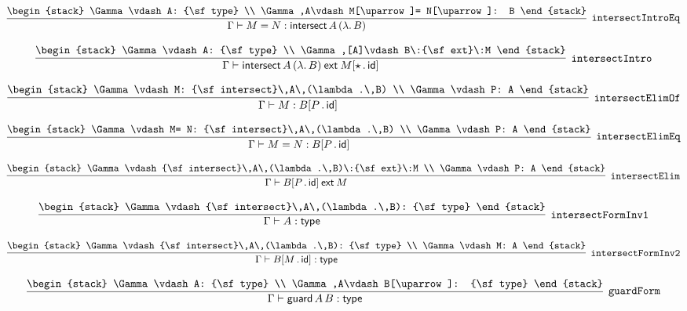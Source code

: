 \[
\infer[{\tt intersectIntroEq}]{\Gamma \vdash M= N: {\sf intersect}\,A\,(\lambda .\,B)}{
\begin{stack}
\Gamma \vdash A: {\sf type}
\\
\Gamma ,A\vdash M[\uparrow ]= N[\uparrow ]: B
\end{stack}}
\]

\[
\infer[{\tt intersectIntro}]{\Gamma \vdash {\sf intersect}\,A\,(\lambda .\,B)\:{\sf ext}\:M[\star \,.\,{\sf id}]}{
\begin{stack}
\Gamma \vdash A: {\sf type}
\\
\Gamma ,[A]\vdash B\:{\sf ext}\:M
\end{stack}}
\]

\[
\infer[{\tt intersectElimOf}]{\Gamma \vdash M: B[P\,.\,{\sf id}]}{
\begin{stack}
\Gamma \vdash M: {\sf intersect}\,A\,(\lambda .\,B)
\\
\Gamma \vdash P: A
\end{stack}}
\]

\[
\infer[{\tt intersectElimEq}]{\Gamma \vdash M= N: B[P\,.\,{\sf id}]}{
\begin{stack}
\Gamma \vdash M= N: {\sf intersect}\,A\,(\lambda .\,B)
\\
\Gamma \vdash P: A
\end{stack}}
\]

\[
\infer[{\tt intersectElim}]{\Gamma \vdash B[P\,.\,{\sf id}]\:{\sf ext}\:M}{
\begin{stack}
\Gamma \vdash {\sf intersect}\,A\,(\lambda .\,B)\:{\sf ext}\:M
\\
\Gamma \vdash P: A
\end{stack}}
\]

\[
\infer[{\tt intersectFormInv1}]{\Gamma \vdash A: {\sf type}}{
\begin{stack}
\Gamma \vdash {\sf intersect}\,A\,(\lambda .\,B): {\sf type}
\end{stack}}
\]

\[
\infer[{\tt intersectFormInv2}]{\Gamma \vdash B[M\,.\,{\sf id}]: {\sf type}}{
\begin{stack}
\Gamma \vdash {\sf intersect}\,A\,(\lambda .\,B): {\sf type}
\\
\Gamma \vdash M: A
\end{stack}}
\]

\[
\infer[{\tt guardForm}]{\Gamma \vdash {\sf guard}\,A\,B: {\sf type}}{
\begin{stack}
\Gamma \vdash A: {\sf type}
\\
\Gamma ,A\vdash B[\uparrow ]: {\sf type}
\end{stack}}
\]


